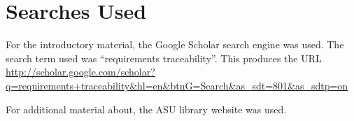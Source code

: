\documentclass[10pt, openany]{report}
\begin{document}
\appendix
\chapter{Searches Used}
For the introductory material, the Google Scholar search engine was used.  The search term used was ``requirements traceability''.  This produces the URL 
\url{http://scholar.google.com/scholar?q=requirements+traceability&hl=en&btnG=Search&as_sdt=801&as_sdtp=on}

For additional material about, the ASU library website was used.
%
%


\end{document}
